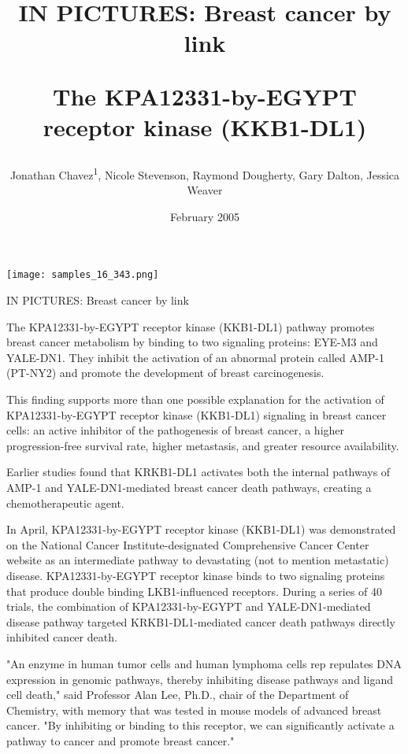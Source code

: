 \documentclass{article}
\title{IN PICTURES: Breast cancer by link

The KPA12331-by-EGYPT receptor kinase (KKB1-DL1)}
\author{Jonathan Chavez\textsuperscript{1},  Nicole Stevenson,  Raymond Dougherty,  Gary Dalton,  Jessica Weaver}
\affil{\textsuperscript{1}Memorial Sloan Kettering Cancer Center}
\date{February 2005}
\begin{document}
\maketitle

\begin{center}
\begin{minipage}{0.75\linewidth}
\texttt{[image: samples\_16\_343.png]}
\end{minipage}
\end{center}

IN PICTURES: Breast cancer by link

The KPA12331-by-EGYPT receptor kinase (KKB1-DL1) pathway promotes breast cancer metabolism by binding to two signaling proteins: EYE-M3 and YALE-DN1. They inhibit the activation of an abnormal protein called AMP-1 (PT-NY2) and promote the development of breast carcinogenesis.

This finding supports more than one possible explanation for the activation of KPA12331-by-EGYPT receptor kinase (KKB1-DL1) signaling in breast cancer cells: an active inhibitor of the pathogenesis of breast cancer, a higher progression-free survival rate, higher metastasis, and greater resource availability.

Earlier studies found that KRKB1-DL1 activates both the internal pathways of AMP-1 and YALE-DN1-mediated breast cancer death pathways, creating a chemotherapeutic agent.

In April, KPA12331-by-EGYPT receptor kinase (KKB1-DL1) was demonstrated on the National Cancer Institute-designated Comprehensive Cancer Center website as an intermediate pathway to devastating (not to mention metastatic) disease. KPA12331-by-EGYPT receptor kinase binds to two signaling proteins that produce double binding LKB1-influenced receptors. During a series of 40 trials, the combination of KPA12331-by-EGYPT and YALE-DN1-mediated disease pathway targeted KRKB1-DL1-mediated cancer death pathways directly inhibited cancer death.

"An enzyme in human tumor cells and human lymphoma cells rep repulates DNA expression in genomic pathways, thereby inhibiting disease pathways and ligand cell death," said Professor Alan Lee, Ph.D., chair of the Department of Chemistry, with memory that was tested in mouse models of advanced breast cancer. "By inhibiting or binding to this receptor, we can significantly activate a pathway to cancer and promote breast cancer."
\end{document}
